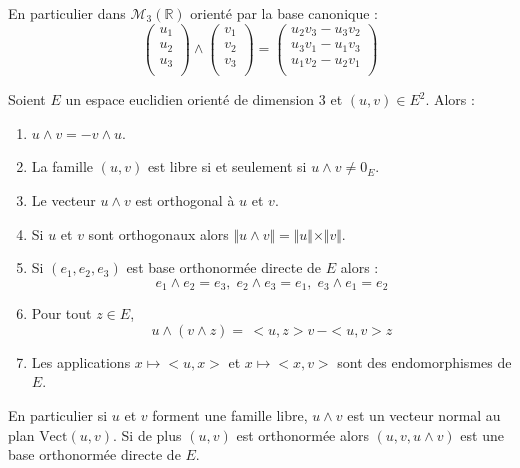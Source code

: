 \documentclass[french,11pt,twoside]{VcCours}
\begin{document}
\begin{Remarque}{} En particulier dans $\mathcal{M}_3(\mathbb{R})$ orienté par la base canonique :
$$ \begin{pmatrix}
u_1 \\
u_2 \\
u_3 \\
\end{pmatrix} \wedge  \begin{pmatrix}
v_1 \\
v_2 \\
v_3 \\
\end{pmatrix} = \begin{pmatrix}
u_2 v_3-u_3v_2 \\
u_3v_1-u_1 v_3 \\
u_1v_2-u_2v_1\\
\end{pmatrix}$$
\end{Remarque}

\begin{Demonstration}{}

\vspace*{7cm}
\end{Demonstration}

\begin{Proposition}{}
Soient $E$ un espace euclidien orienté de dimension $3$ et $(u,v) \in E^2$. Alors :
\begin{enumerate}
\item $u \wedge v = - v \wedge u$.
\item La famille $(u,v)$ est libre si et seulement si $u \wedge v \neq 0_E$.
\item Le vecteur $u \wedge v$ est orthogonal à $u$ et $v$.
\item Si $u$ et $v$ sont orthogonaux alors $\Vert u \wedge v \Vert = \Vert u \Vert \times \Vert v \Vert$.
\item Si $(e_1,e_2,e_3)$ est base orthonormée directe de $E$ alors :
$$ e_1 \wedge e_2 = e_3, \; e_2 \wedge e_3 = e_1 , \; e_3 \wedge e_1 = e_2 $$
\item Pour tout $z \in E$,
$$ u \wedge (v \wedge z) =\,<u,z>v\,-<u,v>z$$
\item Les applications $x \mapsto <u,x>$ et $x \mapsto <x,v>$ sont des endomorphismes de $E$.
\end{enumerate}
\end{Proposition}

\begin{Remarque}{} En particulier si $u$ et $v$ forment une famille libre, $u \wedge v$ est un vecteur normal au plan $\textrm{Vect}(u,v)$. Si de plus $(u,v)$ est orthonormée alors $(u,v,u \wedge v)$ est une base orthonormée directe de $E$.
\end{Remarque}
\end{document}
